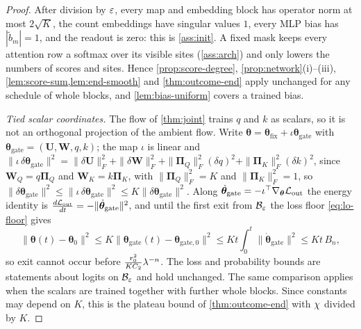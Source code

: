 \begin{proof}
After division by $\varepsilon$, every map and embedding block has operator norm at most $2\sqrt K$, the count embeddings have singular values
$1$, every MLP bias has $|\tilde b_m|=1$, and the readout is zero: this is \cref{ass:init}. A fixed mask keeps every attention row a softmax over
its visible sites (\cref{ass:arch}) and only lowers the numbers of scores and sites. Hence \cref{prop:score-degree}, \cref{prop:network}(i)--(iii),
\cref{lem:score-sum,lem:end-smooth} and \cref{thm:outcome-end} apply unchanged for any schedule of whole blocks, and \cref{lem:bias-uniform} covers a trained bias.

\emph{Tied scalar coordinates.} The flow of \cref{thm:joint} trains $q$ and $k$ as scalars, so it is not an orthogonal projection of
the ambient flow. Write $\bm\theta=\bm\theta_{\mathrm{fix}}+\iota\bm\theta_{\mathrm{gate}}$ with $\bm\theta_{\mathrm{gate}}=(\mathbf U,\mathbf W,q,k)$; the map $\iota$ is linear and
$\|\iota\,\delta\bm\theta_{\mathrm{gate}}\|^2=\|\delta\mathbf U\|_F^2+\|\delta\mathbf W\|_F^2+\|\bm\Pi_Q\|_F^2(\delta q)^2+\|\bm\Pi_K\|_F^2(\delta k)^2$,
since $\mathbf W_Q=q\bm\Pi_Q$ and $\mathbf W_K=k\bm\Pi_K$, with $\|\bm\Pi_Q\|_F^2=K$ and $\|\bm\Pi_K\|_F^2=1$, so $\|\delta\bm\theta_{\mathrm{gate}}\|^2\le\|\iota\,\delta\bm\theta_{\mathrm{gate}}\|^2\le K\|\delta\bm\theta_{\mathrm{gate}}\|^2$. Along
$\dot{\bm\theta}_{\mathrm{gate}}=-\iota^\top\nabla_{\bm\theta}\mathcal L_{\mathrm{out}}$ the energy identity is $\frac{d\mathcal L_{\mathrm{out}}}{dt}=-\|\dot{\bm\theta}_{\mathrm{gate}}\|^2$, and until the first exit from
$\mathcal B_{\varepsilon}$ the loss floor \cref{eq:lo-floor} gives
\[
 \|\bm\theta(t)-\bm\theta_0\|^2\le K\|\bm\theta_{\mathrm{gate}}(t)-\bm\theta_{\mathrm{gate},0}\|^2\le Kt\int_0^t\|\dot{\bm\theta}_{\mathrm{gate}}\|^2\le Kt\,B_n ,
\]
so exit cannot occur before $\frac{r_0^2}{KC_2}\lambda^{-n}$. The loss and probability bounds are statements about logits on $\mathcal B_{\varepsilon}$ and
hold unchanged. The same comparison applies when the scalars are trained together with further whole blocks. Since constants may depend
on $K$, this is the plateau bound of \cref{thm:outcome-end} with $\chi$ divided by $K$.
\end{proof}

